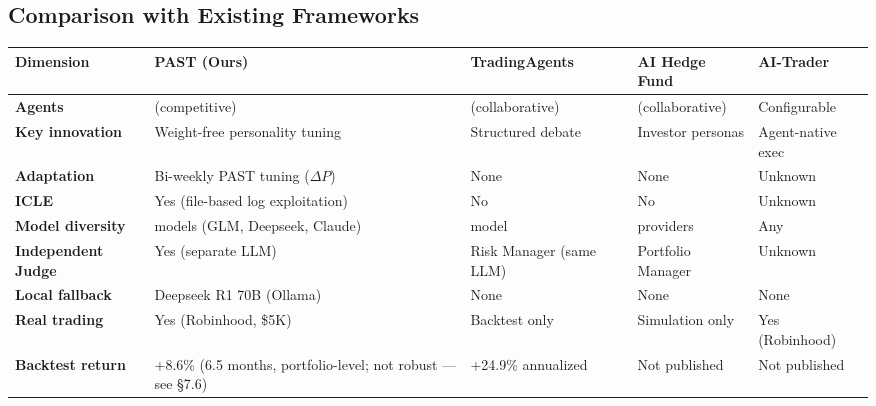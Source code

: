\documentclass[11pt]{article}
\begin{document}
\subsection{Comparison with Existing Frameworks}\label{comparison-with-existing-frameworks}

{\def\LTcaptype{none} %
{\small
\begin{longtable}{@{}
  >{\raggedright\arraybackslash}p{}
  >{\raggedright\arraybackslash}p{}
  >{\raggedright\arraybackslash}p{}
  >{\raggedright\arraybackslash}p{}
  >{\raggedright\arraybackslash}p{}@{}}
\toprule\noalign{}
\begin{minipage}[b]{\linewidth}\raggedright
Dimension
\end{minipage} & \begin{minipage}[b]{\linewidth}\raggedright
PAST (Ours)
\end{minipage} & \begin{minipage}[b]{\linewidth}\raggedright
TradingAgents
\end{minipage} & \begin{minipage}[b]{\linewidth}\raggedright
AI Hedge Fund
\end{minipage} & \begin{minipage}[b]{\linewidth}\raggedright
AI-Trader
\end{minipage} \\
\midrule\noalign{}
\endhead
\bottomrule\noalign{}
\endlastfoot
\renewcommand{\arraystretch}{1.15}
\textbf{Agents} & 4 (competitive) & 7 (collaborative) & 18 (collaborative) & Configurable \\
\textbf{Key innovation} & Weight-free personality tuning & Structured debate & Investor personas & Agent-native exec \\
\textbf{Adaptation} & Bi-weekly PAST tuning (\(\Delta P\)) & None & None & Unknown \\
\textbf{ICLE} & Yes (file-based log exploitation) & No & No & Unknown \\
\textbf{Model diversity} & 3 models (GLM, Deepseek, Claude) & 1 model & 13 providers & Any \\
\textbf{Independent Judge} & Yes (separate LLM) & Risk Manager (same LLM) & Portfolio Manager & Unknown \\
\textbf{Local fallback} & Deepseek R1 70B (Ollama) & None & None & None \\
\textbf{Real trading} & Yes (Robinhood, \$5K) & Backtest only & Simulation only & Yes (Robinhood) \\
\textbf{Backtest return} & +8.6\% (6.5 months, portfolio-level; not robust --- see §7.6) & +24.9\% annualized & Not published & Not published \\
\end{longtable}}
}
\end{document}
